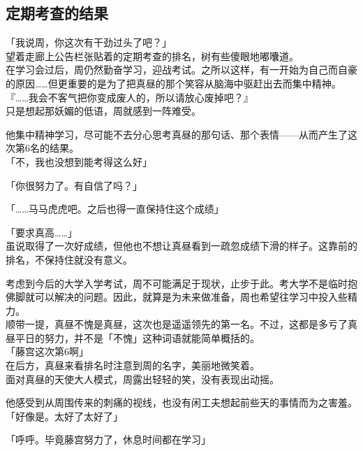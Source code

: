 \subsection{定期考查的结果}

「我说周，你这次有干劲过头了吧？」\\

望着走廊上公告栏张贴着的定期考查的排名，树有些傻眼地嘟囔道。\\

在学习会过后，周仍然勤奋学习，迎战考试。之所以这样，有一开始为自己而自豪的原因……但更重要的是为了把真昼的那个笑容从脑海中驱赶出去而集中精神。\\

『……我会不客气把你变成废人的，所以请放心废掉吧？』\\

只是想起那妖媚的低语，周就感到一阵难受。

他集中精神学习，尽可能不去分心思考真昼的那句话、那个表情——从而产生了这次第6名的结果。\\

「不，我也没想到能考得这么好」

「你很努力了。有自信了吗？」

「……马马虎虎吧。之后也得一直保持住这个成绩」

「要求真高……」\\

虽说取得了一次好成绩，但他也不想让真昼看到一疏忽成绩下滑的样子。这靠前的排名，不保持住就没有意义。

考虑到今后的大学入学考试，周不可能满足于现状，止步于此。考大学不是临时抱佛脚就可以解决的问题。因此，就算是为未来做准备，周也希望往学习中投入些精力。\\

顺带一提，真昼不愧是真昼，这次也是遥遥领先的第一名。不过，这都是多亏了真昼平日的努力，并不是「不愧」这种词语就能简单概括的。\\

「藤宫这次第6啊」\\

在后方，真昼来看排名时注意到周的名字，美丽地微笑着。\\

面对真昼的天使大人模式，周露出轻轻的笑，没有表现出动摇。

他感受到从周围传来的刺痛的视线，也没有闲工夫想起前些天的事情而为之害羞。\\

「好像是。太好了太好了」

「呼呼。毕竟藤宫努力了，休息时间都在学习」

